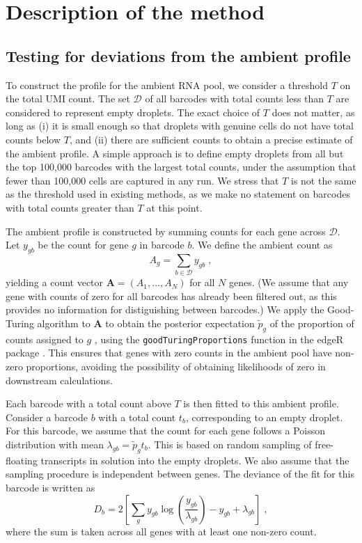 \documentclass[10pt,letterpaper]{article}
\begin{document}
\section*{Description of the method}

\subsection*{Testing for deviations from the ambient profile}
To construct the profile for the ambient RNA pool, we consider a threshold $T$ on the total UMI count.
The set $\mathcal{D}$ of all barcodes with total counts less than $T$ are considered to represent empty droplets.
The exact choice of $T$ does not matter, as long as (i) it is small enough so that droplets with genuine cells do not have total counts below $T$,
and (ii) there are sufficient counts to obtain a precise estimate of the ambient profile.
A simple approach is to define empty droplets from all but the top 100,000 barcodes with the largest total counts, under the assumption that fewer than 100,000 cells are captured in any run.
We stress that $T$ is not the same as the threshold used in existing methods, as we make no statement on barcodes with total counts greater than $T$ at this point.

The ambient profile is constructed by summing counts for each gene across $\mathcal{D}$.
Let $y_{gb}$ be the count for gene $g$ in barcode $b$.
We define the ambient count as 
\[
    A_{g} = \sum_{b \in \mathcal{D}} y_{gb} \;,
\]
yielding a count vector $\mathbf{A} = (A_1, \dots, A_N)$ for all $N$ genes.
(We assume that any gene with counts of zero for all barcodes has already been filtered out, as this provides no information for distiguishing between barcodes.)
We apply the Good-Turing algorithm to $\mathbf{A}$ to obtain the posterior expectation $\tilde{p}_g$ of the proportion of counts assigned to $g$ \cite{gale1995good}, using the \texttt{goodTuringProportions} function in the \textsf{edgeR} package \cite{robinson2010edgeR}.
This ensures that genes with zero counts in the ambient pool have non-zero proportions, avoiding the possibility of obtaining likelihoods of zero in downstream calculations.

Each barcode with a total count above $T$ is then fitted to this ambient profile.
Consider a barcode $b$ with a total count $t_b$, corresponding to an empty droplet.
For this barcode, we assume that the count for each gene follows a Poisson distribution with mean $\lambda_{gb} = \tilde{p}_g t_b$.
This is based on random sampling of free-floating transcripts in solution into the empty droplets.
We also assume that the sampling procedure is independent between genes.
The deviance of the fit for this barcode is written as
\[
    D_b = 2 \left[ \sum_{g} y_{gb} \log\left(\frac{y_{gb}}{\lambda_{gb}}\right) - y_{gb} + \lambda_{gb} \right] \;,
\]
where the sum is taken across all genes with at least one non-zero count.
\end{document}
